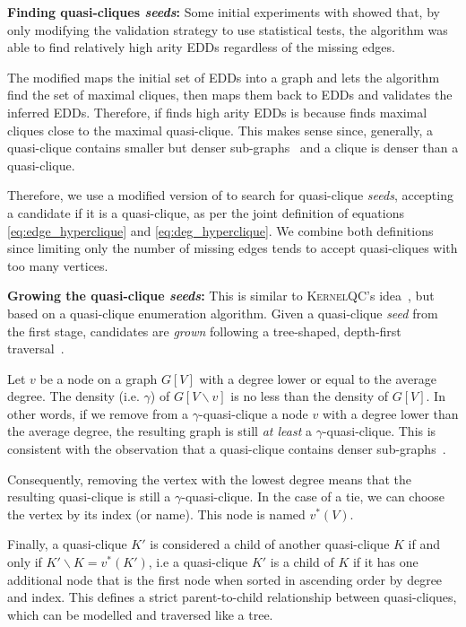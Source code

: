 \textbf{Finding quasi-cliques \emph{seeds}:} Some initial experiments with \Find showed that,
by only modifying the validation strategy to use statistical tests, the algorithm was able
to find relatively high arity \glspl{EDD} regardless of the missing edges.

The modified \Find maps the initial set of \glspl{EDD} into a graph and lets the \Hyperclique
algorithm find the set of maximal cliques, then maps them back to \glspl{EDD} and validates the
inferred \glspl{EDD}. Therefore, if \Find finds high arity \glspl{EDD} is because \Hyperclique finds
maximal cliques close to the maximal quasi-clique. This makes sense since, generally,
a quasi-clique contains smaller but denser sub-graphs~\cite{SaneiMehri2018} and a clique
is denser than a quasi-clique.

Therefore, we use a modified version of \Hyperclique to search for quasi-clique \emph{seeds},
accepting a candidate if it is a quasi-clique, as per the joint definition of equations
\ref{eq:edge_hyperclique} and \ref{eq:deg_hyperclique}.
We combine both definitions since limiting only the number of missing edges tends to accept
quasi-cliques with too many vertices.

\textbf{Growing the quasi-clique \emph{seeds}:} This is similar
to \textsc{KernelQC}'s idea~\cite{SaneiMehri2018}, but based on
a quasi-clique enumeration algorithm. Given a quasi-clique
\emph{seed} from the first stage, candidates are \emph{grown} following a tree-shaped,
depth-first traversal~\cite{uno_efficient_2010}.

Let $v$ be a node on a graph $G[V]$ with a degree lower or equal to the average degree.
The density (i.e. $\gamma$) of $G[V \backslash v]$ is no less than the density of $G[V]$.
In other words, if we remove from a $\gamma$-quasi-clique a node $v$ with a
degree lower than the average degree, the resulting graph is still
\emph{at least} a $\gamma$-quasi-clique.
This is consistent with the observation that a quasi-clique contains
denser sub-graphs~\cite{SaneiMehri2018}.

Consequently, removing the vertex with the lowest degree means that the resulting
quasi-clique is still a $\gamma$-quasi-clique. In the case of a tie, we can choose
the vertex by its index (or name). This node is named $v^*(V)$.

Finally, a quasi-clique $K'$ is considered a child of another quasi-clique $K$
if and only if $K' \backslash K = {v^*(K')}$, i.e a quasi-clique $K'$ is a child
of $K$ if it has one additional
node that is the first node when sorted in ascending order by degree and index.
This defines a strict parent-to-child relationship between quasi-cliques,
which can be modelled and traversed like a tree.

